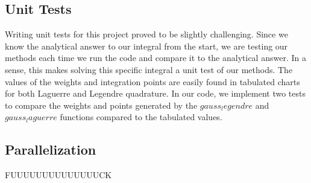 \documentclass{emulateapj}
\begin{document}
\subsection{Unit Tests}
Writing unit tests for this project proved to be slightly challenging. Since we know  the analytical answer to our integral from the start, we are testing our methods each time we run the code and compare it to the analytical answer. In a sense, this makes solving this specific integral a unit test of our methods. The values of the weights and integration points are easily found in tabulated charts for both Laguerre and Legendre quadrature. In our code, we implement two tests to compare the weights and points generated by the $gauss_legendre$ and $gauss_laguerre$ functions compared to the tabulated values.
\subsection{Parallelization}
FUUUUUUUUUUUUUUCK
\end{document}
